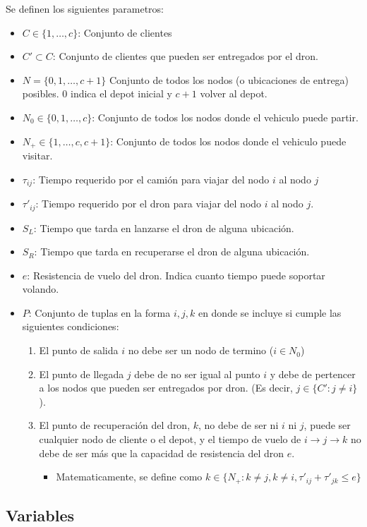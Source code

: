Se definen los siguientes parametros:
\begin{itemize}
\item $C \in \{1,\dots,c\}$: Conjunto de clientes
\item $C' \subset C$: Conjunto de clientes que pueden ser entregados por el dron.
\item $N = \{0,1,\dots,c+1\}$ Conjunto de todos los nodos (o ubicaciones de entrega) posibles. $0$ indica el depot inicial y $c+1$ volver al depot.
\item $N_0 \in \{0,1,\dots,c\}$: Conjunto de todos los nodos donde el vehiculo puede partir.
\item $N_+ \in \{1,\dots,c,c+1\}$: Conjunto de todos los nodos donde el vehiculo puede visitar.
\item $\tau_{ij}$: Tiempo requerido por el camión para viajar del nodo $i$ al nodo $j$
\item $\tau'_{ij}$: Tiempo requerido por el dron para viajar del nodo $i$ al nodo $j$.
\item $S_L$: Tiempo que tarda en lanzarse el dron de alguna ubicación.
\item $S_R$: Tiempo que tarda en recuperarse el dron de alguna ubicación.
\item $e$: Resistencia de vuelo del dron. Indica cuanto tiempo puede soportar volando.
\item $P$: Conjunto de tuplas en la forma $i,j,k$ en donde se incluye si cumple las siguientes condiciones:
\begin{enumerate}
\item El punto de salida $i$ no debe ser un nodo de termino ($i \in N_0$)
\item El punto de llegada $j$ debe de no ser igual al punto $i$ y debe de pertencer a los nodos que pueden ser entregados por dron. (Es decir, $j \in \{C': j \neq i\}$).
\item El punto de recuperación del dron, $k$, no debe de ser ni $i$ ni $j$, puede ser cualquier nodo de cliente o el depot, y el tiempo de vuelo de $i\to j\to k$ no debe de ser más que la capacidad de resistencia del dron $e$.
\begin{itemize}
\item Matematicamente, se define como $k\in\{N_+: k \neq j, k\neq i, \tau'_{ij}+\tau'_{jk}\leq e\}$
\end{itemize}
\end{enumerate}
\end{itemize}

\subsection{Variables}

